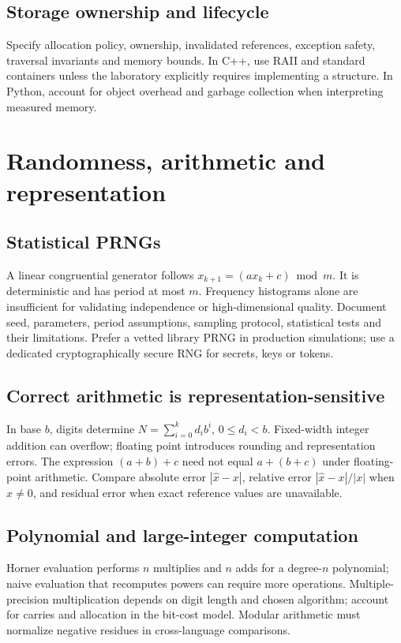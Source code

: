\documentclass[11pt,letterpaper]{article}
\begin{document}
\subsection{Storage ownership and lifecycle}
Specify allocation policy, ownership, invalidated references, exception safety, traversal invariants and memory bounds. In C++, use RAII and standard containers unless the laboratory explicitly requires implementing a structure. In Python, account for object overhead and garbage collection when interpreting measured memory.
\section{Randomness, arithmetic and representation}
\subsection{Statistical PRNGs}
A linear congruential generator follows $x_{k+1}=(ax_k+c)\bmod m$. It is deterministic and has period at most $m$. Frequency histograms alone are insufficient for validating independence or high-dimensional quality. Document seed, parameters, period assumptions, sampling protocol, statistical tests and their limitations. Prefer a vetted library PRNG in production simulations; use a dedicated cryptographically secure RNG for secrets, keys or tokens.
\subsection{Correct arithmetic is representation-sensitive}
In base $b$, digits determine $N=\sum_{i=0}^{k} d_i b^i$, $0\le d_i<b$. Fixed-width integer addition can overflow; floating point introduces rounding and representation errors. The expression $(a+b)+c$ need not equal $a+(b+c)$ under floating-point arithmetic. Compare absolute error $|\hat{x}-x|$, relative error $|\hat{x}-x|/|x|$ when $x\ne 0$, and residual error when exact reference values are unavailable.
\subsection{Polynomial and large-integer computation}
Horner evaluation performs $n$ multiplies and $n$ adds for a degree-$n$ polynomial; naive evaluation that recomputes powers can require more operations. Multiple-precision multiplication depends on digit length and chosen algorithm; account for carries and allocation in the bit-cost model. Modular arithmetic must normalize negative residues in cross-language comparisons.
\end{document}
